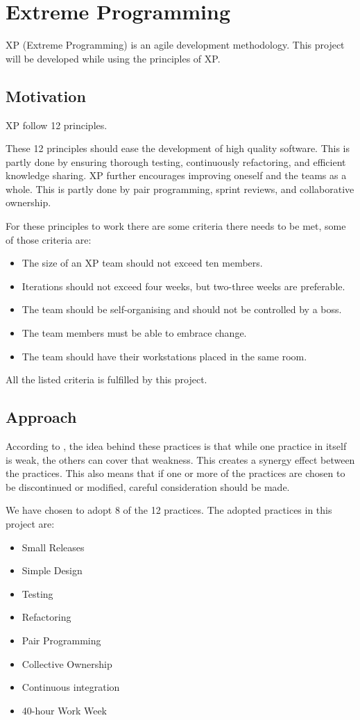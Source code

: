 \section{Extreme Programming}
XP (Extreme Programming) is an agile development methodology. This project will be developed while using the principles of XP.

\subsection{Motivation}
XP follow 12 principles.

These 12 principles should ease the development of high quality software.
This is partly done by ensuring thorough testing, continuously refactoring, and efficient knowledge sharing.
XP further encourages improving oneself and the teams as a whole.
This is partly done by pair programming, sprint reviews, and collaborative ownership.

For these principles to work there are some criteria there needs to be met, some of those criteria are:
\begin{itemize}
\item The size of an XP team should not exceed ten members.
\item Iterations should not exceed four weeks, but two-three weeks are preferable.
\item The team should be self-organising and should not be controlled by a boss.
\item The team members must be able to embrace change.
\item The team should have their workstations placed in the same room.
\end{itemize}

All the listed criteria is fulfilled by this project.

\subsection{Approach}
According to \citet[p. 53]{xp:explained}, the idea behind these practices is that while one practice in itself is weak, the others can cover that weakness. This creates a synergy effect between the practices. This also means that if one or more of the practices are chosen to be discontinued or modified, careful consideration should be made.

We have chosen to adopt 8 of the 12 practices. 
The adopted practices in this project are:
\begin{itemize}
\item Small Releases
\item Simple Design
\item Testing
\item Refactoring
\item Pair Programming
\item Collective Ownership
\item Continuous integration
\item 40-hour Work Week
\end{itemize}


